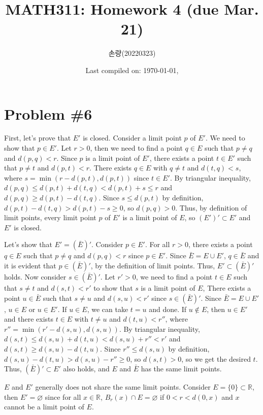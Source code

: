 \documentclass{scrartcl}
\title{MATH311: Homework 4 (due Mar. 21)}
\author{손량(20220323)}
\date{Last compiled on: \today, \currenttime}
\begin{document}
\maketitle

\section{Problem \#6}
First, let's prove that \(E'\) is closed.
Consider a limit point \(p\) of \(E'\).
We need to show that \(p \in E'\).
Let \(r > 0\), then we need to find a point \(q \in E\) such that \(p \not = q\) and \(d(p, q) < r\).
Since \(p\) is a limit point of \(E'\), there exists a point \(t \in E'\) such that \(p \not = t\) and \(d(p, t) < r\).
There exists \(q \in E\) with \(q \not = t\) and \(d(t, q) < s\), where \(s = \min(r - d(p, t), d(p, t))\) since \(t \in E'\).
By triangular inequality, \(d(p, q) \leq d(p, t) + d(t, q) < d(p, t) + s \leq r\) and \(d(p, q) \geq d(p, t) - d(t, q)\).
Since \(s \leq d(p, t)\) by definition, \(d(p, t) - d(t, q) > d(p, t) - s \geq 0\), so \(d(p, q) > 0\).
Thus, by definition of limit points, every limit point \(p\) of \(E'\) is a limit point of \(E\), so \((E')' \subset E'\) and \(E'\) is closed.

Let's show that \(E' = (\bar{E})'\).
Consider \(p \in E'\).
For all \(r > 0\), there exists a point \(q \in E\) such that \(p \not = q\) and \(d(p, q) < r\) since \(p \in E'\).
Since \(\bar{E} = E \cup E'\), \(q \in \bar{E}\) and it is evident that \(p \in (\bar{E})'\), by the definition of limit points.
Thus, \(E' \subset (\bar{E})'\) holds.
Now consider \(s \in (\bar{E})'\).
Let \(r' > 0\), we need to find a point \(t \in E\) such that \(s \not = t\) and \(d(s, t) < r'\) to show that \(s\) is a limit point of \(E\),
There exists a point \(u \in \bar{E}\) such that \(s \not = u\) and \(d(s, u) < r'\) since \(s \in (\bar{E})'\).
Since \(\bar{E} = E \cup E'\), \(u \in E\) or \(u \in E'\).
If \(u \in E\), we can take \(t = u\) and done.
If \(u \not \in E\), then \(u \in E'\) and there exists \(t \in E\) with \(t \not = u\) and \(d(t, u) < r''\), where \(r'' = \min(r' - d(s, u), d(s, u))\).
By triangular inequality, \(d(s, t) \leq d(s, u) + d(t, u) < d(s, u) + r'' < r'\) and \(d(s, t) \geq d(s, u) - d(t, u)\).
Since \(r'' \leq d(s, u)\) by definition, \(d(s, u) - d(t, u) > d(s, u) - r'' \geq 0\), so \(d(s, t) > 0\), so we get the desired \(t\).
Thus, \((\bar{E})' \subset E'\) also holds, and \(E\) and \(\bar{E}\) has the same limit points.

\(E\) and \(E'\) generally does not share the same limit points.
Consider \(E = \{0\} \subset \mathbb{R}\), then \(E' = \varnothing\) since for all \(x \in \mathbb{R}\), \(B_r(x) \cap E = \varnothing\) if \(0 < r < d(0, x)\) and \(x\) cannot be a limit point of \(E\).
\end{document}
